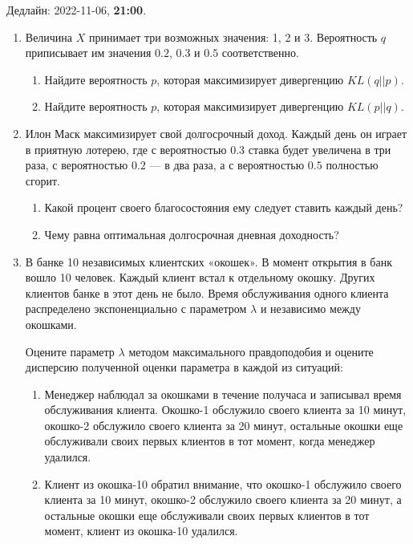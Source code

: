 \documentclass[12pt]{article}
\begin{document}
Дедлайн: 2022-11-06, \textbf{21:00}.


\begin{enumerate}

    \item Величина $X$ принимает три возможных значения: 1, 2 и 3. 
    Вероятность $q$ приписывает им значения $0.2$, $0.3$ и $0.5$ соответственно. 
    
    \begin{enumerate}
        \item Найдите вероятность $p$, которая максимизирует дивергенцию $KL(q||p)$.
        \item Найдите вероятность $p$, которая максимизирует дивергенцию $KL(p||q)$.
    \end{enumerate}
    

\item Илон Маск максимизирует свой долгосрочный доход. 
Каждый день он играет в приятную лотерею, где с вероятностью $0.3$ ставка будет увеличена в три раза,
с вероятностью $0.2$ — в два раза, а с вероятностью $0.5$ полностью сгорит. 

\begin{enumerate}
    \item Какой процент своего благосостояния ему следует ставить каждый день?
    \item Чему равна оптимальная долгосрочная дневная доходность?
\end{enumerate}

\item В банке 10 независимых клиентских «окошек». В момент открытия в банк вошло 10 человек. Каждый
клиент встал к отдельному окошку. Других клиентов банке в этот день не было. 
Время обслуживания одного клиента распределено экспоненциально с параметром $\lambda$ 
и независимо между окошками.  

Оцените параметр $\lambda$ методом максимального правдоподобия и оцените дисперсию полученной оценки параметра в каждой из ситуаций:
\begin{enumerate}
    \item Менеджер наблюдал за окошками в течение получаса и записывал время обслуживания клиента.
    Окошко-1 обслужило своего клиента за 10 минут, окошко-2 обслужило своего клиента за 20
    минут, остальные окошки еще обслуживали своих первых клиентов в тот момент, когда менеджер
    удалился.
    \item Клиент из окошка-10 обратил внимание, что окошко-1 обслужило своего клиента за 10 минут, 
    окошко-2 обслужило своего клиента за 20
    минут, а остальные окошки еще обслуживали своих первых клиентов в тот момент, клиент из окошка-10 удалился.
\end{enumerate}


\end{enumerate}
\end{document}
